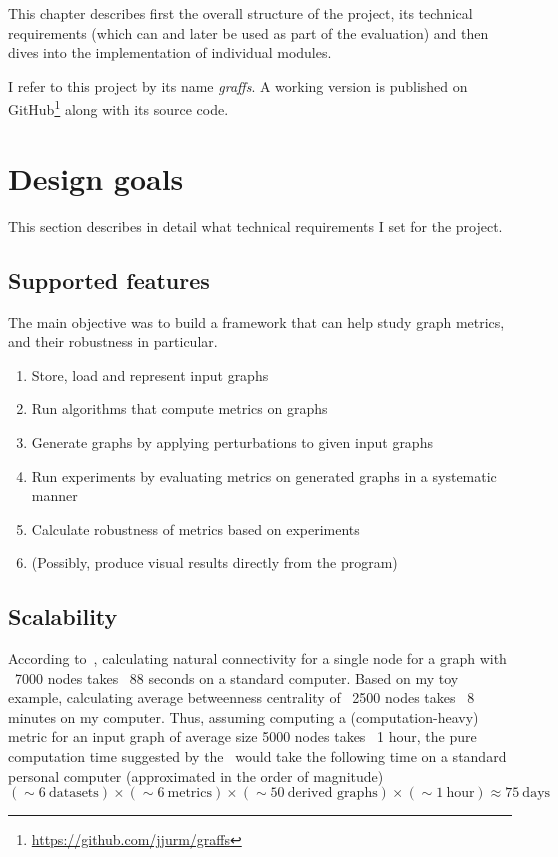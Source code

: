 This chapter describes first the overall structure of the project, its technical requirements (which can and later be used as part of the evaluation) and then dives into the implementation of individual modules.

I refer to this project by its name \textsl{graffs}.
A working version is published on GitHub\footnote{\url{https://github.com/jjurm/graffs}} along with its source code.

\section{Design goals}\label{sec:design-goals}

This section describes in detail what technical requirements I set for the project.


\subsection{Supported features}

The main objective was to build a framework that can help study graph metrics, and their robustness in particular.


\begin{enumerate}
    \item Store, load and represent input graphs
    \item Run algorithms that compute metrics on graphs
    \item Generate graphs by applying perturbations to given input graphs
    \item Run experiments by evaluating metrics on generated graphs in a systematic manner
    \item Calculate robustness of metrics based on experiments
    \item (Possibly, produce visual results directly from the program)
\end{enumerate}


\subsection{Scalability}

According to~\cite{Bozhilova2019}, calculating natural connectivity for a single node for a graph with ~7000 nodes takes ~88 seconds on a standard computer.
Based on my toy example, calculating average betweenness centrality of ~2500 nodes takes ~8 minutes on my computer.
Thus, assuming computing a (computation-heavy) metric for an input graph of average size 5000 nodes takes ~1 hour, the pure computation time suggested by the~ would take the following time on a standard personal computer (approximated in the order of magnitude)
\[(\sim 6\ \text{datasets}) \times (\sim 6\ \text{metrics}) \times (\sim 50\ \text{derived graphs}) \times (\sim 1\ \text{hour}) \approx 75\ \text{days}\]


